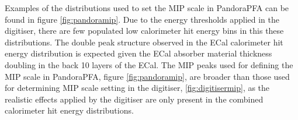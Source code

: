 Examples of the distributions used to set the MIP scale in PandoraPFA can be found in figure \ref{fig:pandoramip}.  Due to the energy thresholds applied in the digitiser, there are few populated low calorimeter hit energy bins in this these distributions.  The double peak structure observed in the ECal calorimeter hit energy distribution is expected given the ECal absorber material thickness doubling in the back 10 layers of the ECal.  The MIP peaks used for defining the MIP scale in PandoraPFA, figure \ref{fig:pandoramip}, are broader than those used for determining MIP scale setting in the digitiser, \ref{fig:digitisermip}, as the realistic effects applied by the digitiser are only present in the combined calorimeter hit energy distributions.  

\begin{figure}[h!]
 \\

\end{figure}
